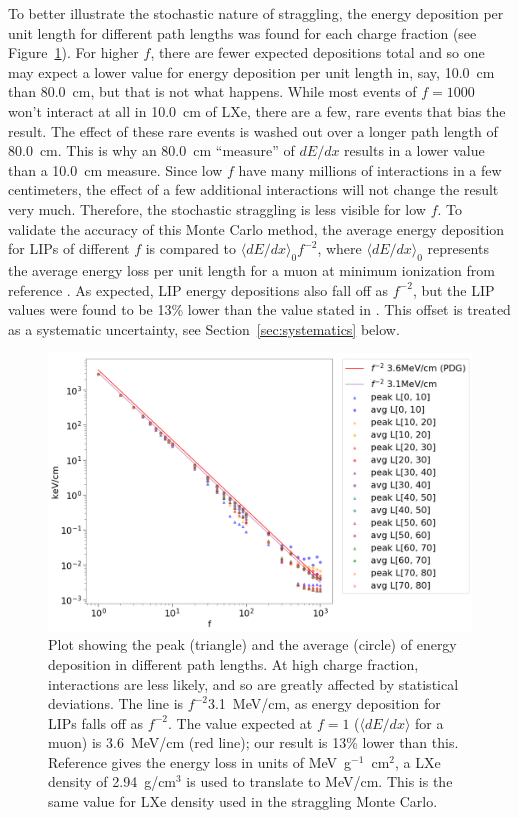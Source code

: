 To better illustrate the stochastic nature of straggling, the energy deposition per unit length for different path lengths was found for each charge fraction (see Figure~\ref{fig:stochastic}). For higher $f$, there are fewer expected depositions total and so one may expect a lower value for energy deposition per unit length in, say, 10.0~cm than 80.0~cm, but that is not what happens. While most events of $f=1000$ won't interact at all in 10.0~cm of \ac{LXe}, there are a few, rare events that bias the result. The effect of these rare events is washed out over a longer path length of 80.0~cm. This is why an 80.0~cm ``measure'' of $dE/dx$ results in a lower value than a 10.0~cm measure. Since low $f$ have many millions of interactions in a few centimeters, the effect of a few additional interactions will not change the result very much. Therefore, the stochastic straggling is less visible for low $f$. To validate the accuracy of this Monte Carlo method, the average energy deposition for \ac{LIP}s of different $f$ is compared to $\langle dE/dx \rangle_{0} f^{-2}$, where $\langle dE/dx \rangle_{0}$ represents the average energy loss per unit length for a muon at minimum ionization from reference \cite{PDG}. As expected, \ac{LIP} energy depositions also fall off as $f^{-2}$, but the \ac{LIP} values were found to be 13\% lower than the value stated in \cite{PDG}. This offset is treated as a systematic uncertainty, see Section~\ref{sec:systematics} below.

 \begin{figure}[htbp]
\begin{center}
\includegraphics[width=\textwidth]{figures/lips/stochastic_wPDG.png}
\caption{Plot showing the peak (triangle) and the average (circle) of energy deposition in different path lengths. At high charge fraction, interactions are less likely, and so are greatly affected by statistical deviations. The line is $f^{-2}$3.1~MeV/cm, as energy deposition for \acs{LIP}s falls off as $f^{-2}$. The value expected at $f=1$ ($\langle dE/dx \rangle$ for a muon) is 3.6~MeV/cm \cite{PDG} (red line); our result is 13\% lower than this. Reference \cite{PDG} gives the energy loss in units of MeV~g$^{-1}$~cm$^{2}$, a \ac{LXe} density of 2.94~g/cm$^{3}$ is used to translate to MeV/cm. This is the same value for \acs{LXe} density used in the straggling Monte Carlo.  }
\label{fig:stochastic}
\end{center}
\end{figure}


